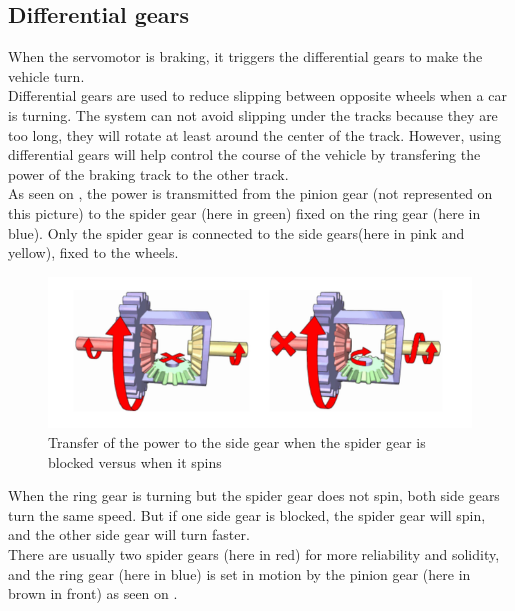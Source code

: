 \subsection{Differential gears}

When the servomotor is braking, it triggers the differential gears to make the vehicle turn.\\
Differential gears are used to reduce slipping between opposite wheels when a car is turning. The system can not avoid slipping under the tracks because they are too long, they will rotate at least around the center of the track. However, using differential gears will help control the course of the vehicle by transfering the power of the braking track to the other track.\\

As seen on , the power is transmitted from the pinion gear (not represented on this picture) to the spider gear (here in green) fixed on the ring gear (here in blue). Only the spider gear is connected to the side gears(here in pink and yellow), fixed to the wheels.\\

\begin{figure}[H]
	\centering
	\includegraphics[scale=0.7]{figures/diffGearLight}
	\caption{Transfer of the power to the side gear when the spider gear is blocked versus when it spins \cite{MechanicalEngineering}}
	\label{diffGearLight}
\end{figure}

When the ring gear is turning but the spider gear does not spin, both side gears turn the same speed. But if one side gear is blocked, the spider gear will spin,  and the other side gear will turn faster.\\

There are usually two spider gears (here in red) for more reliability and solidity, and the ring gear (here in blue) is set in motion by the pinion gear (here in brown in front) as seen on .\\


